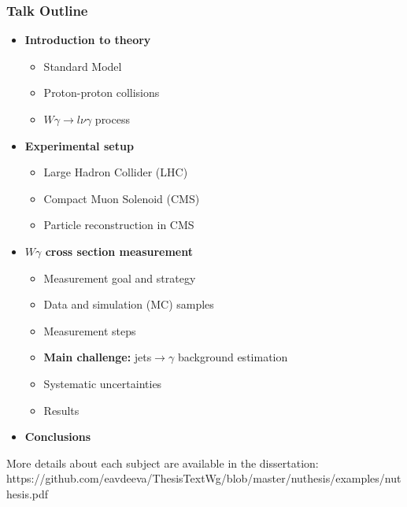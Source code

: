 \begin{frame}\frametitle{Talk Outline}
  \begin{itemize}
     \item {\scriptsize\bfseries{Introduction to theory}}
       \begin{itemize}
          \tiny
          \item Standard Model
          \item Proton-proton collisions
          \item $W\gamma\rightarrow l\nu\gamma$ process
       \end{itemize}
     \item {\scriptsize\bfseries{Experimental setup}}
       \begin{itemize}
          \tiny
          \item Large Hadron Collider (LHC)
          \item Compact Muon Solenoid (CMS)
          \item Particle reconstruction in CMS
       \end{itemize}
     \item {\scriptsize\bfseries{$W\gamma$ cross section measurement}}
       \begin{itemize}
          \tiny
          \item Measurement goal and strategy 
          \item Data and simulation (MC) samples
          \item Measurement steps
          \item {\bfseries{Main challenge:}} jets$\rightarrow\gamma$ background estimation
          \item Systematic uncertainties
          \item Results
       \end{itemize}
     \item {\scriptsize\bfseries{Conclusions}}
  \end{itemize}

  \tiny
  More details about each subject are available in the dissertation:\\
  https://github.com/eavdeeva/ThesisTextWg/blob/master/nuthesis/examples/nuthesis.pdf
\end{frame}%

